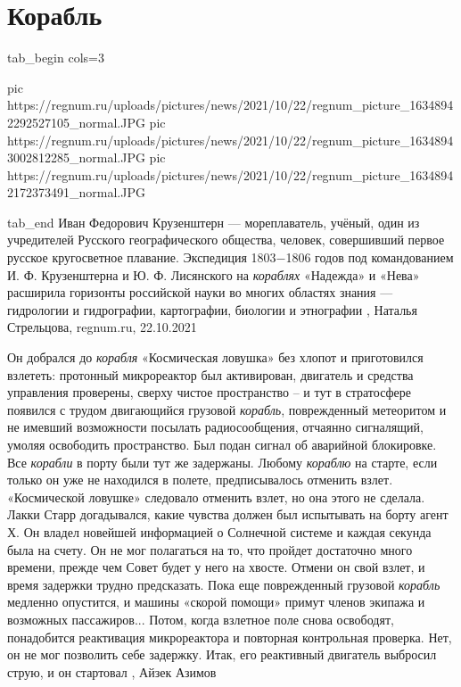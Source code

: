  
 
 
 
 
\chapter{Корабль}


\ifcmt
  tab_begin cols=3

     pic https://regnum.ru/uploads/pictures/news/2021/10/22/regnum_picture_16348942292527105_normal.JPG
     pic https://regnum.ru/uploads/pictures/news/2021/10/22/regnum_picture_16348943002812285_normal.JPG
		 pic https://regnum.ru/uploads/pictures/news/2021/10/22/regnum_picture_16348942172373491_normal.JPG

  tab_end
\fi
Иван Федорович Крузенштерн — мореплаватель, учёный, один из учредителей
Русского географического общества, человек, совершивший первое русское
кругосветное плавание. Экспедиция 1803−1806 годов под командованием И. Ф.
Крузенштерна и Ю. Ф. Лисянского на \emph{кораблях} «Надежда» и «Нева» расширила
горизонты российской науки во многих областях знания — гидрологии и
гидрографии, картографии, биологии и этнографии
, 
Наталья Стрельцова, regnum.ru, 22.10.2021

Он добрался до \emph{корабля} «Космическая ловушка» без хлопот и приготовился
взлететь: протонный микрореактор был активирован, двигатель и средства
управления проверены, сверху чистое пространство – и тут в стратосфере появился
с трудом двигающийся грузовой \emph{корабль}, поврежденный метеоритом и не имевший
возможности посылать радиосообщения, отчаянно сигналящий, умоляя освободить
пространство.  Был подан сигнал об аварийной блокировке. Все \emph{корабли} в порту
были тут же задержаны. Любому \emph{кораблю} на старте, если только он уже не
находился в полете, предписывалось отменить взлет.  «Космической ловушке»
следовало отменить взлет, но она этого не сделала. Лакки Старр догадывался,
какие чувства должен был испытывать на борту агент Х. Он владел новейшей
информацией о Солнечной системе и каждая секунда была на счету.  Он не мог
полагаться на то, что пройдет достаточно много времени, прежде чем Совет будет
у него на хвосте. Отмени он свой взлет, и время задержки трудно предсказать.
Пока еще поврежденный грузовой \emph{корабль} медленно опустится, и машины «скорой
помощи» примут членов экипажа и возможных пассажиров... Потом, когда взлетное
поле снова освободят, понадобится реактивация микрореактора и повторная
контрольная проверка. Нет, он не мог позволить себе задержку.  Итак, его
реактивный двигатель выбросил струю, и он стартовал
, Айзек Азимов

